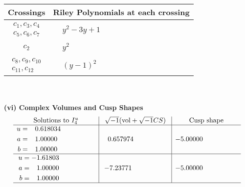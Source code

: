 \documentclass[1p]{elsarticle_modified}
\theoremstyle{definition}
\newcommand{\I}{\sqrt{-1}}
\begin{document}
\begin{tabular}{m{50pt}|m{274pt}}
Crossings & \hspace{64pt}Riley Polynomials at each crossing \\
\hline $$\begin{aligned}c_{1},c_{3},c_{4}\\c_{5},c_{6},c_{7}\end{aligned}$$&$\begin{aligned}
&y^2-3 y+1
\end{aligned}$\\
\hline $$\begin{aligned}c_{2}\end{aligned}$$&$\begin{aligned}
&y^2
\end{aligned}$\\
\hline $$\begin{aligned}c_{8},c_{9},c_{10}\\c_{11},c_{12}\end{aligned}$$&$\begin{aligned}
&(y-1)^2
\end{aligned}$\\
\hline
\end{tabular}\\~\\
\newpage\flushleft \textbf{(vi) Complex Volumes and Cusp Shapes}
$$\begin{array}{c|c|c}  
\text{Solutions to }I^u_{4}& \I (\text{vol} + \sqrt{-1}CS) & \text{Cusp shape}\\
 \hline 
\begin{aligned}
u &= \phantom{-}0.618034\phantom{ +0.000000I} \\
a &= \phantom{-}1.00000\phantom{ +0.000000I} \\
b &= \phantom{-}1.00000\phantom{ +0.000000I}\end{aligned}
 & \phantom{-}0.657974\phantom{ +0.000000I} & -5.00000\phantom{ +0.000000I} \\ \hline\begin{aligned}
u &= -1.61803\phantom{ +0.000000I} \\
a &= \phantom{-}1.00000\phantom{ +0.000000I} \\
b &= \phantom{-}1.00000\phantom{ +0.000000I}\end{aligned}
 & -7.23771\phantom{ +0.000000I} & -5.00000\phantom{ +0.000000I}\\
 \hline 
 \end{array}$$\newpage\newpage\renewcommand{\arraystretch}{1}
\end{document}
